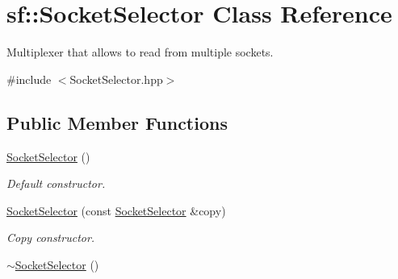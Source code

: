 \hypertarget{classsf_1_1_socket_selector}{\section{sf\+:\+:Socket\+Selector Class Reference}
\label{classsf_1_1_socket_selector}
}


Multiplexer that allows to read from multiple sockets.  




{\ttfamily \#include $<$Socket\+Selector.\+hpp$>$}

\subsection*{Public Member Functions}
\begin{DoxyCompactItemize}
\item 
\hypertarget{classsf_1_1_socket_selector_a741959c5158aeb1e4457cad47d90f76b}{\hyperlink{classsf_1_1_socket_selector_a741959c5158aeb1e4457cad47d90f76b}{Socket\+Selector} ()}\label{classsf_1_1_socket_selector_a741959c5158aeb1e4457cad47d90f76b}

\begin{DoxyCompactList}\small\item\em Default constructor. \end{DoxyCompactList}\item 
\hyperlink{classsf_1_1_socket_selector_a50b1b955eb7ecb2e7c2764f3f4722fbf}{Socket\+Selector} (const \hyperlink{classsf_1_1_socket_selector}{Socket\+Selector} \&copy)
\begin{DoxyCompactList}\small\item\em Copy constructor. \end{DoxyCompactList}\item 
\hypertarget{classsf_1_1_socket_selector_a9069cd61208260b8ed9cf233afa1f73d}{\hyperlink{classsf_1_1_socket_selector_a9069cd61208260b8ed9cf233afa1f73d}{$\sim$\+Socket\+Selector} ()}\label{classsf_1_1_socket_selector_a9069cd61208260b8ed9cf233afa1f73d}


\end{DoxyCompactItemize}
